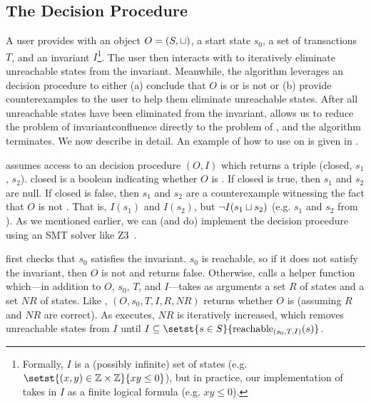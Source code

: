\subsection{The Decision Procedure}
A user provides  with an object $O = (S,
\sqcup)$, a start state $s_0$, a set of transactions $T$, and an invariant
$I$\footnote{%
  Formally, $I$ is a (possibly infinite) set of states (e.g. $\setst{(x, y) \in
  \ints \times \ints}{xy \leq 0}$), but in practice, our implementation of
  \IsInvConfluent{} takes in $I$ as a finite logical formula (e.g. $xy \leq
  0$).
}. The user then interacts with
 to iteratively eliminate unreachable
states from the invariant. Meanwhile, the algorithm leverages an
\invariantclosure{} decision procedure to either (a) conclude that $O$ is or is
not \sTIconfluent{} or (b) provide counterexamples to the user to help them
eliminate unreachable states. After all unreachable states have been eliminated
from the invariant,  allows us to reduce
the problem of invariantconfluence{} directly to the problem of
\invariantclosure{}, and the algorithm terminates.
%
We now describe  in detail. An example of
how to use  on  is given
in .

\IsInvConfluent{} assumes access to an \invariantclosure{} decision procedure
\IsIclosed$(O, I)$ which returns a triple (closed, $s_1$, $s_2$). closed is a
boolean indicating whether $O$ is \Iclosed{}. If closed is true, then $s_1$ and
$s_2$ are null. If closed is false, then $s_1$ and $s_2$ are a counterexample
witnessing the fact that $O$ is not \Iclosed{}. That is, $I(s_1)$ and $I(s_2)$,
but $\lnot I(s_1 \sqcup s_2)$ (e.g. $s_1$ and $s_2$ from ).  As
we mentioned earlier, we can (and do) implement the \invariantclosure{}
decision procedure using an SMT solver like Z3~\cite{de2008z3}.

\IsInvConfluent{} first checks that $s_0$ satisfies the invariant. $s_0$ is
reachable, so if it does not satisfy the invariant, then $O$ is not
\sTIconfluent{} and \IsInvConfluent{} returns false. Otherwise,
\IsInvConfluent{} calls a helper function \Helper{} which---in addition to $O$,
$s_0$, $T$, and $I$---takes as arguments a set $R$ of \sTIreachable{} states
and a set $NR$ of \sTIunreachable{} states. Like \IsInvConfluent, \Helper$(O,
s_0, T, I, R, NR)$ returns whether $O$ is \sTIconfluent{} (assuming $R$ and
$NR$ are correct).  As  executes, $NR$ is
iteratively increased, which removes unreachable states from $I$ until $I
\subseteq \setst{s \in S}{\sTIreachablepredicate{s}}$.

